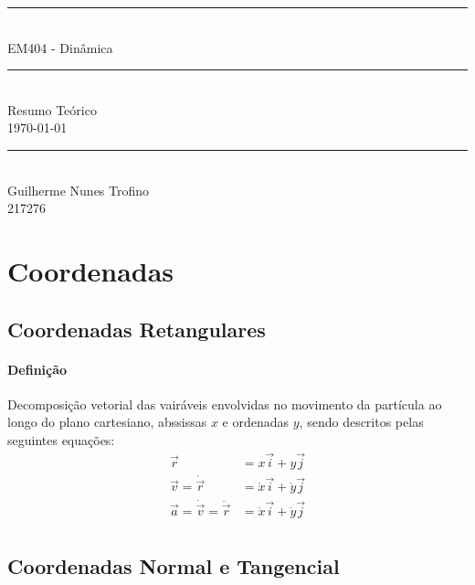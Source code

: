 \documentclass{article}
\begin{document}
    \begin{titlepage}
        \begin{center}
            \rule{450pt}{0.5pt}\\[4mm]
            {\Huge EM404 - Dinâmica}\\
            \rule{450pt}{0.5pt}\\[2mm]
            {\Large Resumo Teórico}\\[200mm]
            \today\\
            \rule{250pt}{0.5pt}\\
            {\large Guilherme Nunes Trofino}\\
            {\large 217276}\\
        \end{center}
    \end{titlepage}
\newpage

    \tableofcontents
\newpage

    \section{Coordenadas}
        \subsection{Coordenadas Retangulares}
            \paragraph{Definição}Decomposição vetorial das vairáveis envolvidas no movimento da partícula ao longo do plano cartesiano, abssissas $x$ e ordenadas $y$, sendo descritos pelas seguintes equações:
                \begin{align*}
                    \vec{r} &= x\vec{i} + y\vec{j}\\
                    \vec{v} = \dot{\vec{r}} &= \dot{x}\vec{i} + \dot{y}\vec{j}\\
                    \vec{a} = \dot{\vec{v}} = \ddot{\vec{r}} &= \ddot{x}\vec{i} + \ddot{y}\vec{j}\\
                \end{align*}

        \subsection{Coordenadas Normal e Tangencial}
\end{document}
